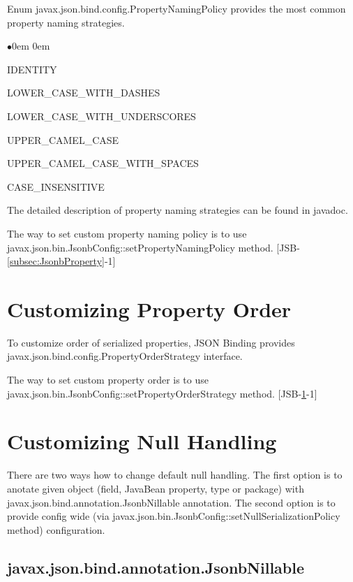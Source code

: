 Enum javax.json.bind.config.PropertyNamingPolicy provides the most common property naming strategies.

\begin{list}{$\bullet$}{\parsep 0em  0em}
\item IDENTITY
\item LOWER\_CASE\_WITH\_DASHES
\item LOWER\_CASE\_WITH\_UNDERSCORES
\item UPPER\_CAMEL\_CASE
\item UPPER\_CAMEL\_CASE\_WITH\_SPACES
\item CASE\_INSENSITIVE
\end{list}

The detailed description of property naming strategies can be found in javadoc.

The way to set custom property naming policy is to use javax.json.bin.JsonbConfig::setPropertyNamingPolicy method. [JSB-\ref{subsec:JsonbProperty}-1]

\section{Customizing Property Order}
\label{sec:custom_property_order}

To customize order of serialized properties, JSON Binding provides javax.json.bind.config.PropertyOrderStrategy interface.

The way to set custom property order is to use javax.json.bin.JsonbConfig::setPropertyOrderStrategy method. [JSB-\ref{sec:custom_property_order}-1]

\section{Customizing Null Handling}
\label{sec:custom_null_handling}

There are two ways how to change default null handling. The first option is to anotate given object (field, JavaBean property, type or package) with javax.json.bind.annotation.JsonbNillable annotation. The second option is to provide config wide (via javax.json.bin.JsonbConfig::setNullSerializationPolicy method) configuration.

\subsection{javax.json.bind.annotation.JsonbNillable}
\label{subsec:JsonbNillable}

